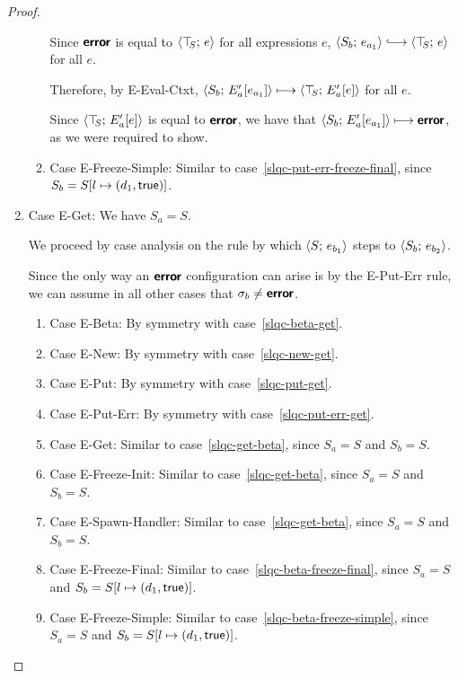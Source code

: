 \begin{proof}
\begin{enumerate}
\begin{enumerate}
      Since $\textbf{\textsf{error}}$ is equal to $\langle \top\hspace{-0.85mm}_{S};\, e \rangle$ for all
      expressions $e$, $\config{S_b}{e_{a_1}} \parstepsto
      \config{\topS}{e}$ for all $e$.

      Therefore, by {\sc E-Eval-Ctxt},
      $\langle S_b;\, E'_a\hspace{-0.5mm}\left[e_{a_1}\right] \rangle \longmapsto
      \langle \top\hspace{-0.85mm}_{S};\, E'_a\hspace{-0.5mm}\left[e\right] \rangle$ for all $e$.

      Since $\langle \top\hspace{-0.85mm}_{S};\, E'_a\hspace{-0.5mm}\left[e\right] \rangle$ is equal to $\textbf{\textsf{error}}$,
      we have that $\langle S_b;\, E'_a\hspace{-0.5mm}\left[e_{a_1}\right] \rangle \longmapsto
      \textbf{\textsf{error}}$, as we were required to show.

    \item \label{slqc-put-err-freeze-simple}Case {\sc
      E-Freeze-Simple}: Similar to
      case~\ref{slqc-put-err-freeze-final}, since $S_b =
      S[l \mapsto (d_1, \textsf{true})]$.

    \end{enumerate}
  \item Case {\sc E-Get}: We have $S_a = S$.

    We proceed by case analysis on the rule by which
    $\langle S;\, e_{b_1} \rangle$ steps to $\langle S_b;\, e_{b_2} \rangle$.

    Since the only way an $\textbf{\textsf{error}}$ configuration can arise is by the
    {\sc E-Put-Err} rule, we can assume in all other cases that
    $\sigma_b \neq \textbf{\textsf{error}}$.
    \begin{enumerate}
    \item \label{slqc-get-beta}Case {\sc E-Beta}: By symmetry with case~\ref{slqc-beta-get}.
    \item \label{slqc-get-new}Case {\sc E-New}: By symmetry with case~\ref{slqc-new-get}.
    \item \label{slqc-get-put}Case {\sc E-Put}: By symmetry with case~\ref{slqc-put-get}.
    \item \label{slqc-get-put-err}Case {\sc E-Put-Err}: By symmetry with case~\ref{slqc-put-err-get}.
    \item \label{slqc-get-get}Case {\sc E-Get}: Similar to
      case~\ref{slqc-get-beta}, since $S_a = S$ and $S_b = S$.
    \item \label{slqc-get-freeze-init}Case {\sc E-Freeze-Init}:
      Similar to case~\ref{slqc-get-beta}, since $S_a = S$ and $S_b = S$.
    \item \label{slqc-get-spawn-handler}Case {\sc E-Spawn-Handler}:
      Similar to case~\ref{slqc-get-beta}, since $S_a = S$ and $S_b = S$.
    \item \label{slqc-get-freeze-final}Case {\sc E-Freeze-Final}:
      Similar to case~\ref{slqc-beta-freeze-final}, since $S_a = S$
      and $S_b = S[l \mapsto (d_1, \textsf{true})]$.
    \item \label{slqc-get-freeze-simple}Case {\sc E-Freeze-Simple}:
      Similar to case~\ref{slqc-beta-freeze-simple}, since $S_a = S$
      and $S_b = S[l \mapsto (d_1, \textsf{true})]$.
    \end{enumerate}


\end{enumerate}
\end{proof}
